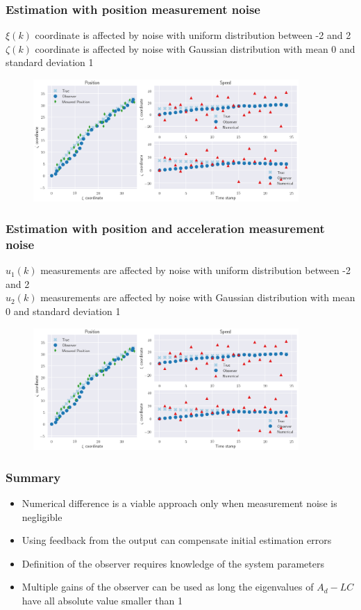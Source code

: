 \begin{frame}
	\frametitle{Estimation with position measurement noise}
	$\xi(k)$ coordinate is affected by noise with uniform distribution between -2 and 2\\
	$\zeta(k)$ coordinate is affected by noise with Gaussian distribution with mean 0 and standard deviation 1
	\begin{figure}
		\includegraphics[width=0.9\textwidth]{fig/observer_ex_2}
	\end{figure}
\end{frame}

\begin{frame}
	\frametitle{Estimation with position and acceleration measurement noise}
	$u_1(k)$ measurements are affected by noise with uniform distribution between -2 and 2\\
	$u_2(k)$ measurements are affected by noise with Gaussian distribution with mean 0 and standard deviation 1
	\begin{figure}
		\includegraphics[width=0.9\textwidth]{fig/observer_ex_3}
	\end{figure}
\end{frame}

\begin{frame}
	\frametitle{Summary}
	\begin{itemize}
		\setlength\itemsep{1.5em}
		\item Numerical difference is a viable approach only when measurement noise is negligible
		\item Using feedback from the output can compensate initial estimation errors
		\item Definition of the observer requires knowledge of the system parameters
		\item Multiple gains of the observer can be used as long the eigenvalues of $A_d-LC$ have all absolute value smaller than 1
	\end{itemize}

\end{frame}